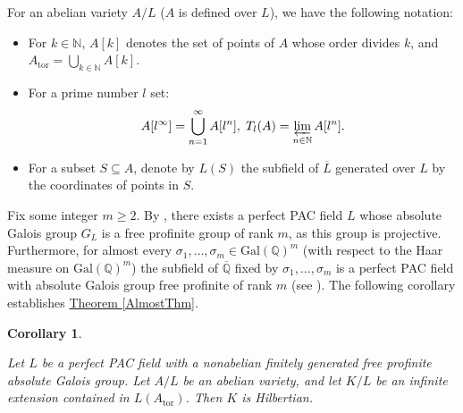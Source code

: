 \documentclass[12pt,a4paper]{article}
\newtheorem{corollary}[theorem]{Corollary}
\newcommand{\thmref}[1]{\hyperref[#1]{Theorem \ref*{#1}}}
\begin{document}
For an abelian variety $A/L$ ($A$ is defined over $L$), we have the following notation:

\begin{itemize}

\item For $k \in \mathbb{N}$, $A[k]$ denotes the set of points of $A$ whose order divides $k$, and $A_{\mathrm{tor}} = \bigcup_{k \in \mathbb{N}} A[k]$.

\item For a prime number $l$ set: $$A[l^{\infty}] = \bigcup_{n = 1}^{\infty} A[l^n], \hspace{1mm} T_l(A) = \varprojlim_{n \in \mathbb{N}} A[l^n].$$

\item For a subset $S \subseteq A$, denote by $L(S)$ the subfield of $\overline{L}$ generated over $L$ by the coordinates of points in $S$.

\end{itemize}  

Fix some integer $m \geq 2$. By \cite[Corollary 23.1.2]{FJ}, there exists a perfect PAC field $L$ whose absolute Galois group $G_L$ is a free profinite group of rank $m$, as this group is projective. Furthermore, for almost every $\sigma_1, \dots, \sigma_m \in \mathrm{Gal}(\mathbb{Q})^m$ (with respect to the Haar measure on $\mathrm{Gal}(\mathbb{Q})^m$) the subfield of $\overline{\mathbb{Q}}$ fixed by $\sigma_1, \dots, \sigma_m$ is a perfect PAC field with absolute Galois group free profinite of rank $m$ (see \mbox{\cite[Chapter 20]{FJ}).} The following corollary establishes \thmref{AlmostThm}.

\begin{corollary} \label{AbVarCor}

Let $L$ be a perfect PAC field with a nonabelian finitely generated free profinite absolute Galois group. Let $A/L$ be an abelian variety, and let $K/L$ be an infinite extension contained in $L(A_{\mathrm{tor}})$. Then $K$ is Hilbertian. 

\end{corollary}
\end{document}
